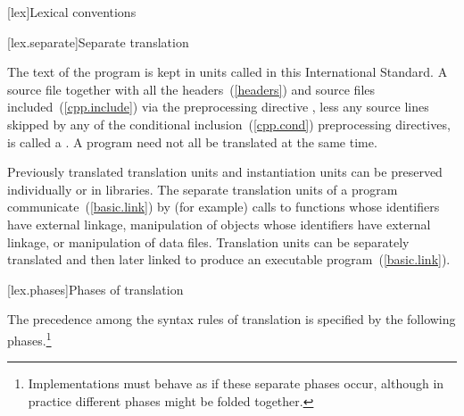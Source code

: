 [lex]{Lexical conventions}



[lex.separate]{Separate translation}

\pnum
{}%
%
The text of the program is kept in units called
 in this International
Standard. A source file together with all the headers~(\ref{headers})
and source files included~(\ref{cpp.include}) via the preprocessing
directive , less any source lines skipped by any of the
conditional inclusion~(\ref{cpp.cond}) preprocessing directives, is
called a .
\enternote A \Cpp program need not all be translated at the same time.
\exitnote

\pnum
\enternote Previously translated translation units and instantiation
units can be preserved individually or in libraries. The separate
translation units of a program communicate~(\ref{basic.link}) by (for
example) calls to functions whose identifiers have external linkage,
manipulation of objects whose identifiers have external linkage, or
manipulation of data files. Translation units can be separately
translated and then later linked to produce an executable
program~(\ref{basic.link}). \exitnote%

[lex.phases]{Phases of translation}%

\pnum
{}
The precedence among the syntax rules of translation is specified by the
following phases.\footnote{Implementations must behave as if these separate phases
occur, although in practice different phases might be folded together.}

